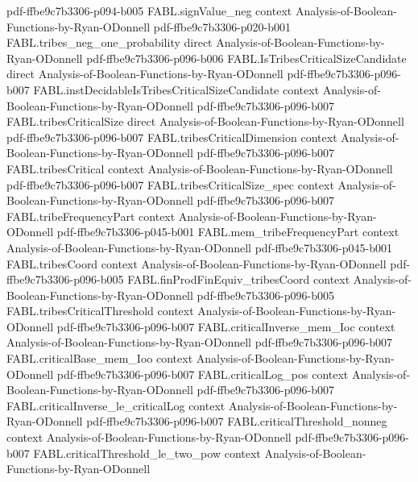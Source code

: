 \begin{theorem}
  {pdf-ffbe9c7b3306-p094-b005}
\proofstep
  {FABL.signValue_neg}
  {context}
  {Analysis-of-Boolean-Functions-by-Ryan-ODonnell}
  {pdf-ffbe9c7b3306-p020-b001}
\proofstep
  {FABL.tribes_neg_one_probability}
  {direct}
  {Analysis-of-Boolean-Functions-by-Ryan-ODonnell}
  {pdf-ffbe9c7b3306-p096-b006}
\proofstep
  {FABL.IsTribesCriticalSizeCandidate}
  {direct}
  {Analysis-of-Boolean-Functions-by-Ryan-ODonnell}
  {pdf-ffbe9c7b3306-p096-b007}
\proofstep
  {FABL.instDecidableIsTribesCriticalSizeCandidate}
  {context}
  {Analysis-of-Boolean-Functions-by-Ryan-ODonnell}
  {pdf-ffbe9c7b3306-p096-b007}
\proofstep
  {FABL.tribesCriticalSize}
  {direct}
  {Analysis-of-Boolean-Functions-by-Ryan-ODonnell}
  {pdf-ffbe9c7b3306-p096-b007}
\proofstep
  {FABL.tribesCriticalDimension}
  {context}
  {Analysis-of-Boolean-Functions-by-Ryan-ODonnell}
  {pdf-ffbe9c7b3306-p096-b007}
\proofstep
  {FABL.tribesCritical}
  {context}
  {Analysis-of-Boolean-Functions-by-Ryan-ODonnell}
  {pdf-ffbe9c7b3306-p096-b007}
\proofstep
  {FABL.tribesCriticalSize_spec}
  {context}
  {Analysis-of-Boolean-Functions-by-Ryan-ODonnell}
  {pdf-ffbe9c7b3306-p096-b007}
\proofstep
  {FABL.tribeFrequencyPart}
  {context}
  {Analysis-of-Boolean-Functions-by-Ryan-ODonnell}
  {pdf-ffbe9c7b3306-p045-b001}
\proofstep
  {FABL.mem_tribeFrequencyPart}
  {context}
  {Analysis-of-Boolean-Functions-by-Ryan-ODonnell}
  {pdf-ffbe9c7b3306-p045-b001}
\proofstep
  {FABL.tribesCoord}
  {context}
  {Analysis-of-Boolean-Functions-by-Ryan-ODonnell}
  {pdf-ffbe9c7b3306-p096-b005}
\proofstep
  {FABL.finProdFinEquiv_tribesCoord}
  {context}
  {Analysis-of-Boolean-Functions-by-Ryan-ODonnell}
  {pdf-ffbe9c7b3306-p096-b005}
\proofstep
  {FABL.tribesCriticalThreshold}
  {context}
  {Analysis-of-Boolean-Functions-by-Ryan-ODonnell}
  {pdf-ffbe9c7b3306-p096-b007}
\proofstep
  {FABL.criticalInverse_mem_Ioc}
  {context}
  {Analysis-of-Boolean-Functions-by-Ryan-ODonnell}
  {pdf-ffbe9c7b3306-p096-b007}
\proofstep
  {FABL.criticalBase_mem_Ioo}
  {context}
  {Analysis-of-Boolean-Functions-by-Ryan-ODonnell}
  {pdf-ffbe9c7b3306-p096-b007}
\proofstep
  {FABL.criticalLog_pos}
  {context}
  {Analysis-of-Boolean-Functions-by-Ryan-ODonnell}
  {pdf-ffbe9c7b3306-p096-b007}
\proofstep
  {FABL.criticalInverse_le_criticalLog}
  {context}
  {Analysis-of-Boolean-Functions-by-Ryan-ODonnell}
  {pdf-ffbe9c7b3306-p096-b007}
\proofstep
  {FABL.criticalThreshold_nonneg}
  {context}
  {Analysis-of-Boolean-Functions-by-Ryan-ODonnell}
  {pdf-ffbe9c7b3306-p096-b007}
\proofstep
  {FABL.criticalThreshold_le_two_pow}
  {context}
  {Analysis-of-Boolean-Functions-by-Ryan-ODonnell}

\end{theorem}
